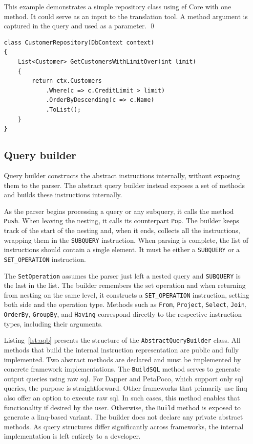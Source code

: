 \begin{example}
\small
This example demonstrates a simple repository class using \acrshort{ef} Core with one method. 
It could serve as an input to the translation tool. A method argument is captured in the query and used as a parameter.
\qed
\begin{lstlisting}[language=CSharp]
class CustomerRepository(DbContext context)
{
    List<Customer> GetCustomersWithLimitOver(int limit)
    {
        return ctx.Customers
            .Where(c => c.CreditLimit > limit)
            .OrderByDescending(c => c.Name)
            .ToList();
    }
}
\end{lstlisting}
\end{example}

\subsection{Query builder}

Query builder constructs the abstract instructions internally, without exposing them to the parser. The abstract query builder instead exposes a set of methods and builds these instructions internally.

As the parser begins processing a query or any subquery, it calls the method \texttt{Push}. When leaving the nesting, it calls its counterpart \texttt{Pop}. The builder keeps track of the start of the nesting and, when it ends, collects all the instructions, wrapping them in the \texttt{SUBQUERY} instruction. When parsing is complete, the list of instructions should contain a single element. It must be either a \texttt{SUBQUERY} or a \texttt{SET\_OPERATION} instruction.

The \texttt{SetOperation} assumes the parser just left a nested query and \texttt{SUBQUERY} is the last in the list. The builder remembers the set operation and when returning from nesting on the same level, it constructs a \texttt{SET\_OPERATION} instruction, setting both side and the operation type.
Methods such as \texttt{From}, \texttt{Project}, \texttt{Select}, \texttt{Join}, \texttt{OrderBy}, \texttt{GroupBy}, and \texttt{Having} correspond directly to the respective instruction types, including their arguments. 

Listing~\ref{lst:aqb} presents the structure of the \texttt{AbstractQueryBuilder} class. All methods that build the internal instruction representation are public and fully implemented. Two abstract methods are declared and must be implemented by concrete framework implementations. The \texttt{BuildSQL} method serves to generate output queries using raw \acrshort{sql}. For Dapper and PetaPoco, which support only \acrshort{sql} queries, the purpose is straightforward. Other frameworks that primarily use \acrshort{linq} also offer an option to execute raw \acrshort{sql}. In such cases, this method enables that functionality if desired by the user. Otherwise, the \texttt{Build} method is exposed to generate a \acrshort{linq}-based variant. The builder does not declare any private abstract methods. As query structures differ significantly across frameworks, the internal implementation is left entirely to a developer.

